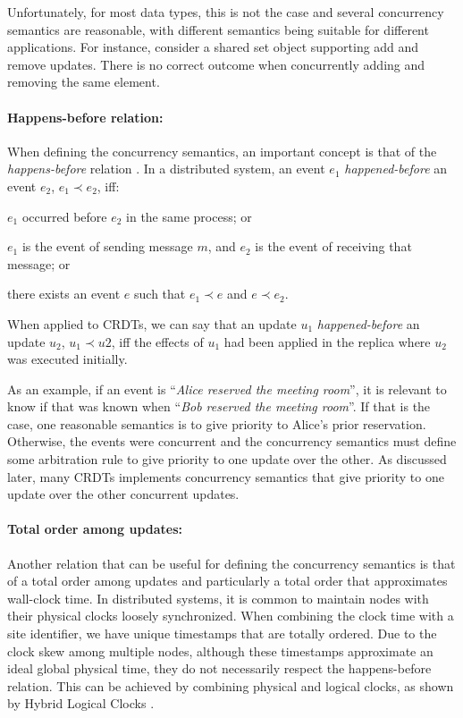 \documentclass[11pt,a4paper]{article}
\begin{document}
Unfortunately, for most data types, this is not the case and several 
concurrency semantics are reasonable, with different semantics being 
suitable for different applications.
For instance, consider a shared set object supporting add and
remove updates. 
There is no correct outcome when concurrently adding and removing the same
element.


\paragraph{Happens-before relation:}
When defining the concurrency semantics, an important concept 
is that of the \emph{happens-before} relation \cite{Lamport78Time}. 
In a distributed system, an event $e_1$ \emph{happened-before} an event $e_2$, 
$e_1 \prec e_2$, iff:
\begin{inparaenum}[(i)]
\item $e_1$ occurred before $e_2$ in the same process; or 
\item $e_1$ is the event of sending message $m$, and $e_2$ is the event
of receiving that message; or
\item there exists an event $e$ such that $e_1 \prec e$ and $e \prec e_2$. 
\end{inparaenum}
When applied to CRDTs, we can say that an
update $u_1$ \emph{happened-before} an update $u_2$, $u_1 \prec u2$, iff the 
effects of $u_1$ had been applied in the replica where $u_2$ was executed 
initially.

As an example, if an event is ``\emph{Alice reserved the meeting room}'', it 
is relevant to know if that was known when ``\emph{Bob reserved the meeting room}''.
If that is the case, one reasonable semantics is to give priority to Alice's prior reservation.
Otherwise, the events were concurrent and the concurrency semantics must define 
some arbitration rule to give priority to one update over the other.
As discussed later, many CRDTs implements concurrency semantics that give priority 
to one update over the other concurrent updates.

\paragraph{Total order among updates:}
Another relation that can be useful for defining the concurrency semantics is 
that of a total order among updates and particularly a total order that 
approximates wall-clock time. 
In distributed systems, it is common to maintain nodes with their physical clocks 
loosely synchronized. 
When combining the clock time with a site identifier, we have unique 
timestamps that are totally ordered.
Due to the clock skew among multiple nodes, although these timestamps
approximate an ideal global physical time, they do not necessarily respect the happens-before
relation.
This can be achieved by combining physical and logical clocks, as
shown by Hybrid Logical Clocks \cite{DBLP:conf/opodis/KulkarniDMAL14}.
\end{document}

